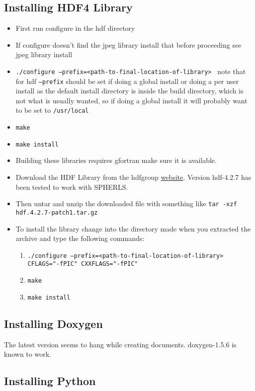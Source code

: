 \documentclass[11pt]{article}
\begin{document}
\subsection{Installing HDF4 Library}
\begin{itemize}
\item First run configure in the hdf directory
\item If configure doesn't find the jpeg library install that before proceeding see jpeg library install
\item {\tt ./configure --prefix=<path-to-final-location-of-library> } note that for hdf {\tt --prefix} should be set if doing a global install or doing a per user install as the default install directory is inside the build directory, which is not what is usually wanted, so if doing a global install it will probably want to be set to {\tt /usr/local}
\item {\tt  make}
\item {\tt  make install}
\item Building these libraries requires gfortran make sure it is available.
\item Download the HDF Library from the hdfgroup \href{http://www.hdfgroup.org/ftp/HDF/HDF_Current/src/}{website}. Version hdf-4.2.7 has been tested to work with SPHERLS.
\item Then untar and unzip the downloaded file with something like {\tt tar -xzf hdf.4.2.7-patch1.tar.gz}
\item To install the library change into the directory made when you extracted the archive and type the following commands:
\begin{enumerate}
\item {\tt ./configure --prefix=<path-to-final-location-of-library> CFLAGS="-fPIC" CXXFLAGS="-fPIC"}
\item {\tt make}
\item {\tt make install}
\end{enumerate}
\end{itemize}

\subsection{Installing Doxygen}
The latest version seems to hang while creating documents. doxygen-1.5.6 is known to work.

\subsection{Installing Python}
    
\end{document}
